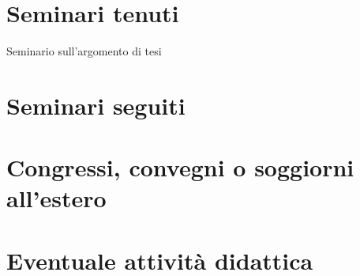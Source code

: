 \documentclass[11pt]{article}
\begin{document}
\section*{Seminari tenuti}

\begin{description}

\item[%
] 

\item[%
Seminario sull'argomento di tesi] 


\end{description}



\section*{Seminari seguiti}

\begin{description}

\item[%
] 

\item[%
] 

\end{description}


\section*{Congressi, convegni o soggiorni all'estero}

\begin{description}

\item[%
] 

\end{description}


\section*{Eventuale attivit\`a didattica}

\begin{description}

\item[%
] 

\end{description}
\end{document}

